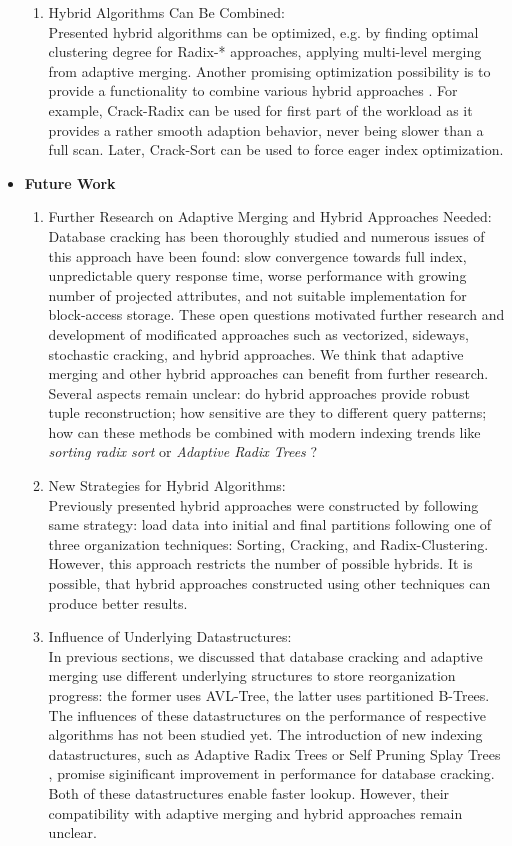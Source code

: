 \documentclass[10pt, conference, compsocconf]{IEEEtran}
\begin{document}
\begin{itemize}
\begin{enumerate}
\item{Hybrid Algorithms Can Be Combined:}\\
Presented hybrid algorithms can be optimized, e.g. by finding optimal clustering degree for Radix-* approaches, applying multi-level merging from adaptive merging. Another promising optimization possibility is to provide a functionality to combine various hybrid approaches \cite{hybrid}. For example, Crack-Radix can be used for first part of the workload as it provides a rather smooth adaption behavior, never being slower than a full scan. Later, Crack-Sort can be used to force eager index optimization.\\
\end{enumerate}
\item{\textbf{Future Work}}
\begin{enumerate}
\item{Further Research on Adaptive Merging and Hybrid Approaches Needed:}\\
Database cracking has been thoroughly studied and numerous issues of this approach have been found: slow convergence towards full index, unpredictable query response time, worse performance with growing number of projected attributes, and not suitable implementation for block-access storage. These open questions motivated further research and development of modificated approaches such as vectorized, sideways, stochastic cracking, and hybrid approaches. We think that adaptive merging and other hybrid approaches can benefit from further research. Several aspects remain unclear: do hybrid approaches provide robust tuple reconstruction; how sensitive are they to different query patterns; how can these methods be combined with modern indexing trends like \emph{sorting radix sort} or \emph{Adaptive Radix Trees} \cite{art}? \\
\item{New Strategies for Hybrid Algorithms:}\\
Previously presented hybrid approaches were constructed by following same strategy: load data into initial and final partitions following one of three organization techniques: Sorting, Cracking, and Radix-Clustering. However, this approach restricts the number of possible hybrids. It is possible, that hybrid approaches constructed using other techniques can produce better results.\\
\item{Influence of Underlying Datastructures:}\\
In previous sections, we discussed that database cracking and adaptive merging use different underlying structures to store reorganization progress: the former uses AVL-Tree, the latter uses partitioned B-Trees. The influences of these datastructures on the performance of respective algorithms has not been studied yet. The introduction of new indexing datastructures, such as Adaptive Radix Trees or Self Pruning Splay Trees \cite{spst}, promise siginificant improvement in performance for database cracking. Both of these datastructures enable faster lookup. However, their compatibility with adaptive merging and hybrid approaches remain unclear.\\

\end{enumerate}
\end{itemize}
\end{document}
